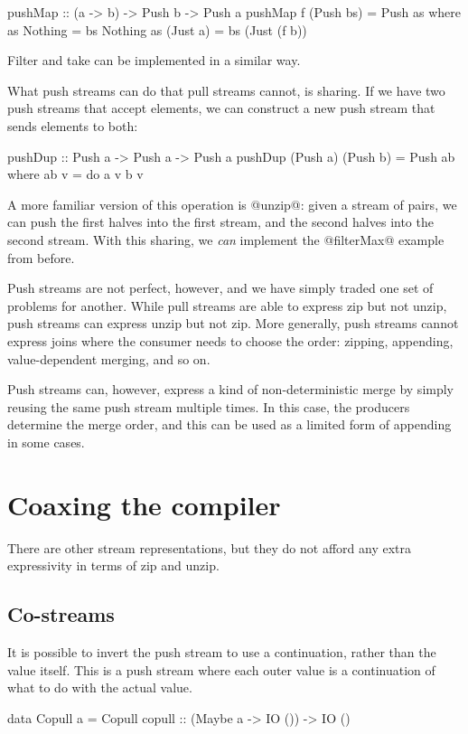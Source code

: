 \begin{code}
pushMap :: (a -> b) -> Push b -> Push a
pushMap f (Push bs) = Push as
 where
  as Nothing  = bs Nothing
  as (Just a) = bs (Just (f b))
\end{code}

Filter and take can be implemented in a similar way.

What push streams can do that pull streams cannot, is sharing.
If we have two push streams that accept elements, we can construct a new push stream that sends elements to both:

\begin{code}
pushDup :: Push a -> Push a -> Push a
pushDup (Push a) (Push b) = Push ab
 where
  ab v = do
   a v
   b v
\end{code}

A more familiar version of this operation is @unzip@: given a stream of pairs, we can push the first halves into the first stream, and the second halves into the second stream.
With this sharing, we \emph{can} implement the @filterMax@ example from before.

Push streams are not perfect, however, and we have simply traded one set of problems for another.
While pull streams are able to express zip but not unzip, push streams can express unzip but not zip.
More generally, push streams cannot express joins where the consumer needs to choose the order: zipping, appending, value-dependent merging, and so on.

Push streams can, however, express a kind of non-deterministic merge by simply reusing the same push stream multiple times.
In this case, the producers determine the merge order, and this can be used as a limited form of appending in some cases.

\section{Coaxing the compiler}
There are other stream representations, but they do not afford any extra expressivity in terms of zip and unzip.

\subsection{Co-streams}
It is possible to invert the push stream to use a continuation, rather than the value itself.
This is a push stream where each outer value is a continuation of what to do with the actual value.

\begin{code}
data Copull a
  = Copull
  { copull :: (Maybe a -> IO ()) -> IO () }
\end{code}

